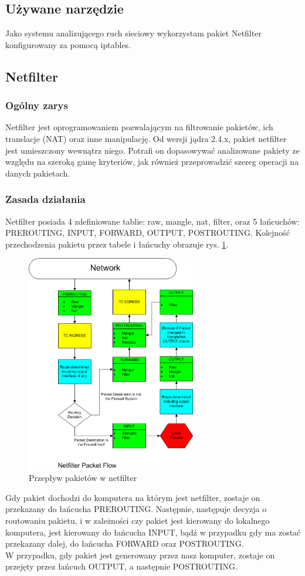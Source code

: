 \documentclass[a4paper,12pt]{book}
\begin{document}
		\subsection{Używane narzędzie}
			Jako systemu analizującego ruch sieciowy wykorzystam pakiet Netfilter konfigurowany za pomocą iptables.
		\subsection{Netfilter}
			\subsubsection{Ogólny zarys}
				Netfilter jest oprogramowaniem pozwalającym na filtrowanie pakietów, ich translacje (NAT) oraz inne manipulację.
				Od wersji jądra 2.4.x, pakiet netfilter jest umieszczony wewnątrz niego.
				Potrafi on dopasowywać analizowane pakiety ze względu na szeroką gamę kryteriów, jak również przeprowadzić szereg operacji na danych pakietach.
			\subsubsection{Zasada działania}
				Netfilter posiada 4 zdefiniowane tablie: raw, mangle, nat, filter, oraz 5 łańcuchów: PREROUTING, INPUT, FORWARD, OUTPUT, POSTROUTING.
				Kolejność przechodzenia pakietu przez tabele i łańcuchy obrazuje rys. \ref{fig:flowchart}.\\
				\begin{figure}[h]
					\centering
						\includegraphics[width=280px]{Netfilter.png}
						\caption{Przepływ pakietów w netfilter}
						\label{fig:flowchart}
				\end{figure}
				Gdy pakiet dochodzi do komputera na którym jest netfilter, zostaje on przekazany do łańcucha PREROUTING. Następnie, następuje decyzja o routowaniu pakietu, i w zależności czy pakiet jest kierowany do lokalnego komputera, jest kierowany do łańcucha INPUT, bądź w przypadku gdy ma zostać przekazany dalej, do łańcucha FORWARD oraz POSTROUTING.\\
				W przypadku, gdy pakiet jest generowany przez nasz komputer, zostaje on przejęty przez łańcuch OUTPUT, a następnie POSTROUTING.
\end{document}
